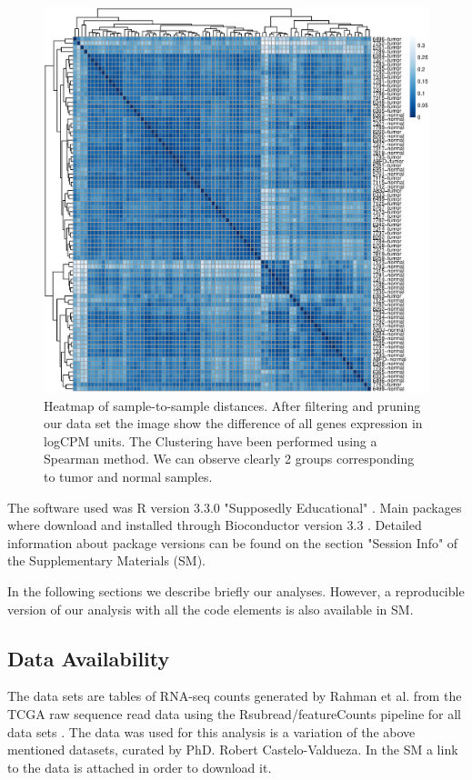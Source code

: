 \documentclass[9pt,twocolumn,twoside]{gsajnl}
\begin{document}
\begin{figure}[!h]
\centering

\includegraphics[width=.9\textwidth]{Clustering.eps}

\caption{Heatmap of sample-to-sample distances. After filtering and pruning our data set the image show the difference of all genes expression in logCPM units. The Clustering have been performed using a Spearman method. We can observe clearly 2 groups corresponding to tumor and normal samples. 
}
\label{fig:Clustering}
\end{figure}

The software used was R version 3.3.0 "Supposedly Educational" \cite{R}. Main packages where download and installed through Bioconductor version 3.3 \citep{bioconductor}. Detailed information about package versions can be found on the section "Session Info" of the Supplementary Materials (SM).

In the following sections we describe briefly our analyses. However, a reproducible version of our analysis with all the code elements is also available in SM.


\subsection*{Data Availability}

The data sets are tables of RNA-seq counts generated by Rahman et al. \cite{Rahman15112015} from the TCGA raw sequence read data using the Rsubread/featureCounts pipeline for all data sets \cite{Rsubread}. The data was used for this analysis is a variation of the above mentioned datasets, curated by PhD. Robert Castelo-Valdueza. In the SM a link to the data is attached in order to download it. 
\end{document}
